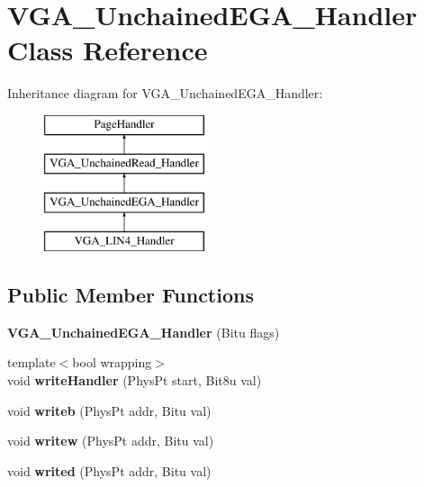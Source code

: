 \hypertarget{classVGA__UnchainedEGA__Handler}{\section{V\-G\-A\-\_\-\-Unchained\-E\-G\-A\-\_\-\-Handler Class Reference}
\label{classVGA__UnchainedEGA__Handler}
}
Inheritance diagram for V\-G\-A\-\_\-\-Unchained\-E\-G\-A\-\_\-\-Handler\-:\begin{figure}[H]
\begin{center}
\leavevmode
\includegraphics[height=4.000000cm]{classVGA__UnchainedEGA__Handler}
\end{center}
\end{figure}
\subsection*{Public Member Functions}
\begin{DoxyCompactItemize}
\item 
\hypertarget{classVGA__UnchainedEGA__Handler_a969505a60909e5392ac799a5f55d304c}{{\bfseries V\-G\-A\-\_\-\-Unchained\-E\-G\-A\-\_\-\-Handler} (Bitu flags)}\label{classVGA__UnchainedEGA__Handler_a969505a60909e5392ac799a5f55d304c}

\item 
\hypertarget{classVGA__UnchainedEGA__Handler_a937a7057b0ea5e9da4f58379d82742e0}{{\footnotesize template$<$bool wrapping$>$ }\\void {\bfseries write\-Handler} (Phys\-Pt start, Bit8u val)}\label{classVGA__UnchainedEGA__Handler_a937a7057b0ea5e9da4f58379d82742e0}

\item 
\hypertarget{classVGA__UnchainedEGA__Handler_a577a5b592201f6cc7c0d2b260adac254}{void {\bfseries writeb} (Phys\-Pt addr, Bitu val)}\label{classVGA__UnchainedEGA__Handler_a577a5b592201f6cc7c0d2b260adac254}

\item 
\hypertarget{classVGA__UnchainedEGA__Handler_aa33163579ed352328309caa47b5b42c1}{void {\bfseries writew} (Phys\-Pt addr, Bitu val)}\label{classVGA__UnchainedEGA__Handler_aa33163579ed352328309caa47b5b42c1}

\item 
\hypertarget{classVGA__UnchainedEGA__Handler_a8113cfb7906db9f18e15b79d73219dd5}{void {\bfseries writed} (Phys\-Pt addr, Bitu val)}\label{classVGA__UnchainedEGA__Handler_a8113cfb7906db9f18e15b79d73219dd5}

\end{DoxyCompactItemize}


